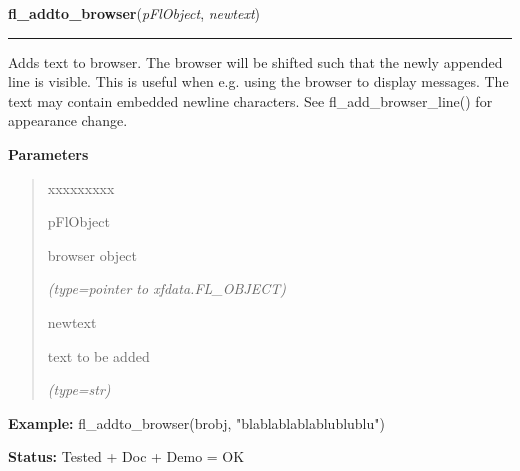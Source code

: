 \hspace{.8\funcindent}\begin{boxedminipage}{\funcwidth}

    \raggedright \textbf{fl\_addto\_browser}(\textit{pFlObject}, \textit{newtext})

    \vspace{-1.5ex}

    \rule{\textwidth}{0.5\fboxrule}
\setlength{\parskip}{2ex}
    Adds text to browser. The browser will be shifted such that the newly 
    appended line is visible. This is useful when e.g. using the browser to
    display messages. The text may contain embedded newline characters. See
    fl\_add\_browser\_line() for appearance change.

\setlength{\parskip}{1ex}
      \textbf{Parameters}
      \vspace{-1ex}

      \begin{quote}
        \begin{Ventry}{xxxxxxxxx}

          \item[pFlObject]

          browser object

            {\it (type=pointer to xfdata.FL\_OBJECT)}

          \item[newtext]

          text to be added

            {\it (type=str)}

        \end{Ventry}

      \end{quote}

\textbf{Example:} fl\_addto\_browser(brobj, "blablablablablublublu")



\textbf{Status:} Tested + Doc + Demo = OK



    \end{boxedminipage}

    \label{xformslib:flbrowser:fl_addto_browser_chars}

    \vspace{0.5ex}

